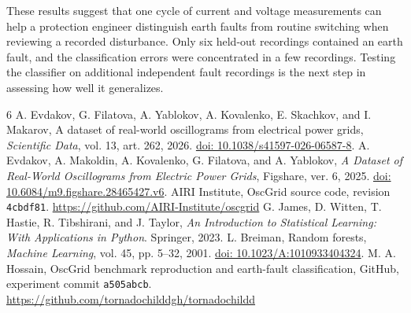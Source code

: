 \documentclass[11pt,conference,letterpaper]{IEEEtran}
\begin{document}
These results suggest that one cycle of current and voltage measurements can help a protection engineer distinguish earth faults from routine switching when reviewing a recorded disturbance. Only six held-out recordings contained an earth fault, and the classification errors were concentrated in a few recordings. Testing the classifier on additional independent fault recordings is the next step in assessing how well it generalizes.

\begin{thebibliography}{6}
 A. Evdakov, G. Filatova, A. Yablokov, A. Kovalenko, E. Skachkov, and I. Makarov, A dataset of real-world oscillograms from electrical power grids, \emph{Scientific Data}, vol. 13, art. 262, 2026. \href{https://doi.org/10.1038/s41597-026-06587-8}{doi: 10.1038/s41597-026-06587-8}.
 A. Evdakov, A. Makoldin, A. Kovalenko, G. Filatova, and A. Yablokov, \emph{A Dataset of Real-World Oscillograms from Electric Power Grids}, Figshare, ver. 6, 2025. \href{https://doi.org/10.6084/m9.figshare.28465427.v6}{doi: 10.6084/m9.figshare.28465427.v6}.
 AIRI Institute, OscGrid source code, revision \texttt{4cbdf81}. \url{https://github.com/AIRI-Institute/oscgrid}
 G. James, D. Witten, T. Hastie, R. Tibshirani, and J. Taylor, \emph{An Introduction to Statistical Learning: With Applications in Python}. Springer, 2023.
 L. Breiman, Random forests, \emph{Machine Learning}, vol. 45, pp. 5--32, 2001. \href{https://doi.org/10.1023/A:1010933404324}{doi: 10.1023/A:1010933404324}.
 M. A. Hossain, OscGrid benchmark reproduction and earth-fault classification, GitHub, experiment commit \texttt{a505abcb}. \url{https://github.com/tornadochilddgh/tornadochildd}
\end{thebibliography}
\end{document}
